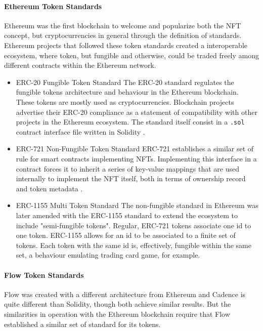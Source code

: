 \documentclass[../main.tex]{subfiles}
\begin{document}
\paragraph{Ethereum Token Standards}
Ethereum was the first blockchain to welcome and popularize both the NFT concept, but cryptocurrencies in general through the definition of standards. Ethereum projects that followed these token standards created a interoperable ecosystem, where token, but fungible and otherwise, could be traded freely among different contracts within the Ethereum network.
\begin{itemize}
    \item{ERC-20 Fungible Token Standard} The ERC-20 standard regulates the fungible tokens architecture and behaviour in the Ethereum blockchain. These tokens are mostly used as cryptocurrencies. Blockchain projects advertise their ERC-20 compliance as a statement of compatibility with other projects in the Ethereum ecosystem. The standard itself consist in a \verb|.sol| contract interface file written in Solidity \cite{ERC20}.

    \item {ERC-721 Non-Fungible Token Standard} ERC-721 establishes a similar set of rule for smart contracts implementing NFTs. Implementing this interface in a contract forces it to inherit a series of key-value mappings that are used internally to implement the NFT itself, both in terms of ownership record and token metadata \cite{ERC721}.

    \item{ERC-1155 Multi Token Standard} The non-fungible standard in Ethereum was later amended with the ERC-1155 standard to extend the ecosystem to include "semi-fungible tokens". Regular, ERC-721 tokens associate one id to one token. ERC-1155 allows for an id to be associated to a finite set of tokens. Each token with the same id is, effectively, fungible within the same set, a behaviour emulating trading card game, for example.
\end{itemize}

\paragraph{Flow Token Standards}
\label{sec:flow_token_standards}
Flow was created with a different architecture from Ethereum and Cadence is quite different than Solidity, though both achieve similar results. But the similarities in operation with the Ethereum blockchain require that Flow established a similar set of standard for its tokens.
\end{document}
